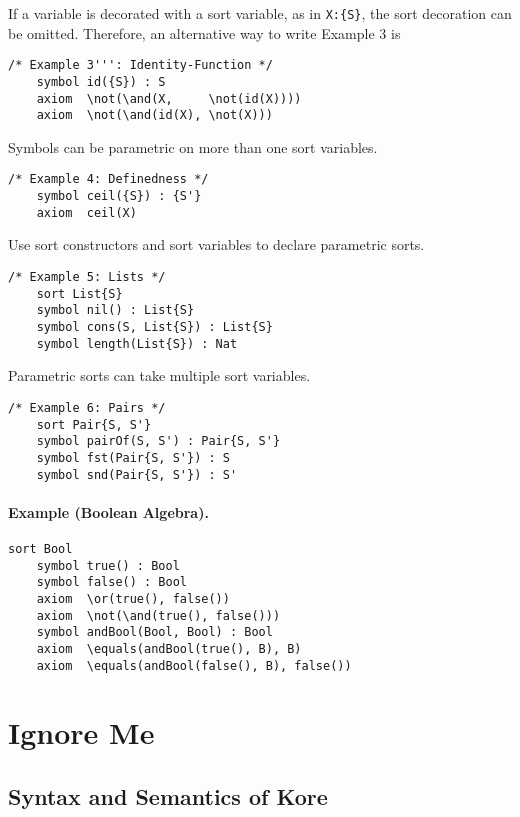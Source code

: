 \documentclass[UTF8,11pt]{article}
\theoremstyle{plain}
\theoremstyle{definition}
\theoremstyle{remark}
\begin{document}
If a variable is decorated with a sort variable, as in {\small\verb|X:{S}|}, the sort decoration can be omitted. Therefore, an alternative way to write Example 3 is
\begin{Verbatim}[fontsize=\small]
    /* Example 3''': Identity-Function */
    symbol id({S}) : S
    axiom  \not(\and(X,     \not(id(X))))
    axiom  \not(\and(id(X), \not(X)))
\end{Verbatim}

Symbols can be parametric on more than one sort variables.
\begin{Verbatim}[fontsize=\small]
    /* Example 4: Definedness */
    symbol ceil({S}) : {S'}
    axiom  ceil(X)
\end{Verbatim}

Use sort constructors and sort variables to declare parametric sorts.
\begin{Verbatim}[fontsize=\small]
    /* Example 5: Lists */
    sort List{S}
    symbol nil() : List{S}
    symbol cons(S, List{S}) : List{S}
    symbol length(List{S}) : Nat
\end{Verbatim}

Parametric sorts can take multiple sort variables.
\begin{Verbatim}[fontsize=\small]
    /* Example 6: Pairs */
    sort Pair{S, S'}
    symbol pairOf(S, S') : Pair{S, S'}
    symbol fst(Pair{S, S'}) : S
    symbol snd(Pair{S, S'}) : S'  
\end{Verbatim}

\paragraph{Example (Boolean Algebra).}
\begin{Verbatim}[fontsize=\small]
    sort Bool
    symbol true() : Bool
    symbol false() : Bool
    axiom  \or(true(), false())
    axiom  \not(\and(true(), false()))
    symbol andBool(Bool, Bool) : Bool
    axiom  \equals(andBool(true(), B), B)
    axiom  \equals(andBool(false(), B), false())
\end{Verbatim}



\section{Ignore Me}

\subsection{Syntax and Semantics of Kore}
\label{sec:syntax-of-kore}
\end{document}
